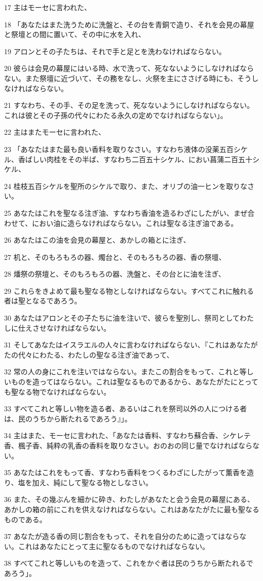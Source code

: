 \par 17 主はモーセに言われた、
\par 18 「あなたはまた洗うために洗盤と、その台を青銅で造り、それを会見の幕屋と祭壇との間に置いて、その中に水を入れ、
\par 19 アロンとその子たちは、それで手と足とを洗わなければならない。
\par 20 彼らは会見の幕屋にはいる時、水で洗って、死なないようにしなければならない。また祭壇に近づいて、その務をなし、火祭を主にささげる時にも、そうしなければならない。
\par 21 すなわち、その手、その足を洗って、死なないようにしなければならない。これは彼とその子孫の代々にわたる永久の定めでなければならない」。
\par 22 主はまたモーセに言われた、
\par 23 「あなたはまた最も良い香料を取りなさい。すなわち液体の没薬五百シケル、香ばしい肉桂をその半ば、すなわち二百五十シケル、におい菖蒲二百五十シケル、
\par 24 桂枝五百シケルを聖所のシケルで取り、また、オリブの油一ヒンを取りなさい。
\par 25 あなたはこれを聖なる注ぎ油、すなわち香油を造るわざにしたがい、まぜ合わせて、におい油に造らなければならない。これは聖なる注ぎ油である。
\par 26 あなたはこの油を会見の幕屋と、あかしの箱とに注ぎ、
\par 27 机と、そのもろもろの器、燭台と、そのもろもろの器、香の祭壇、
\par 28 燔祭の祭壇と、そのもろもろの器、洗盤と、その台とに油を注ぎ、
\par 29 これらをきよめて最も聖なる物としなければならない。すべてこれに触れる者は聖となるであろう。
\par 30 あなたはアロンとその子たちに油を注いで、彼らを聖別し、祭司としてわたしに仕えさせなければならない。
\par 31 そしてあなたはイスラエルの人々に言わなければならない、『これはあなたがたの代々にわたる、わたしの聖なる注ぎ油であって、
\par 32 常の人の身にこれを注いではならない。またこの割合をもって、これと等しいものを造ってはならない。これは聖なるものであるから、あなたがたにとっても聖なる物でなければならない。
\par 33 すべてこれと等しい物を造る者、あるいはこれを祭司以外の人につける者は、民のうちから断たれるであろう』」。
\par 34 主はまた、モーセに言われた、「あなたは香料、すなわち蘇合香、シケレテ香、楓子香、純粋の乳香の香料を取りなさい。おのおの同じ量でなければならない。
\par 35 あなたはこれをもって香、すなわち香料をつくるわざにしたがって薫香を造り、塩を加え、純にして聖なる物としなさい。
\par 36 また、その幾ぶんを細かに砕き、わたしがあなたと会う会見の幕屋にある、あかしの箱の前にこれを供えなければならない。これはあなたがたに最も聖なるものである。
\par 37 あなたが造る香の同じ割合をもって、それを自分のために造ってはならない。これはあなたにとって主に聖なるものでなければならない。
\par 38 すべてこれと等しいものを造って、これをかぐ者は民のうちから断たれるであろう」。

